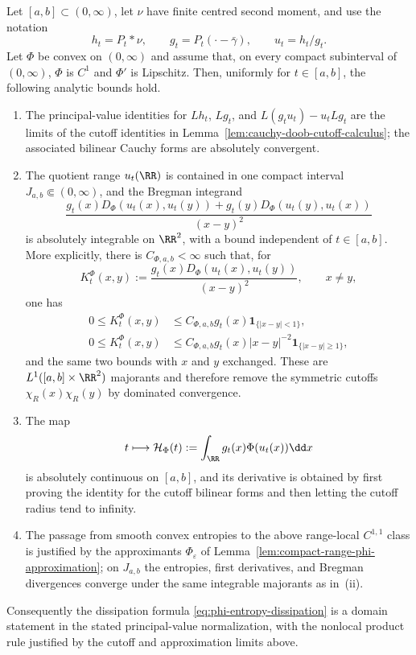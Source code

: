 \begin{lemma}%
\label{lem:doob-bregman-domain-bounds}
Let $[a,b]\subset(0,\infty)$, let $\nu$ have finite centred second moment, and
use the notation
\[
h_t=P_t*\nu,
\qquad
g_t=P_t(\cdot-\bar{\gamma}),
\qquad
u_t=h_t/g_t .
\]
Let $\Phi$ be convex on $(0,\infty)$ and assume that, on every compact
subinterval of $(0,\infty)$, $\Phi$ is $C^1$ and $\Phi'$ is Lipschitz.  Then,
uniformly for $t\in[a,b]$, the following analytic bounds hold.
\begin{enumerate}[label=\textup{(\roman*)},leftmargin=*]
\item The principal-value identities for $Lh_t$, $Lg_t$, and
$L(g_tu_t)-u_tLg_t$ are the limits of the cutoff identities in
Lemma~\ref{lem:cauchy-doob-cutoff-calculus}; the associated bilinear Cauchy
forms are absolutely convergent.
\item The quotient range $u_t(\RR)$ is contained in one compact interval
$J_{a,b}\Subset(0,\infty)$, and the Bregman integrand
\[
\frac{g_t(x)D_\Phi(u_t(x),u_t(y))
      +g_t(y)D_\Phi(u_t(y),u_t(x))}{(x-y)^2}
\]
is absolutely integrable on $\RR^2$, with a bound independent of
$t\in[a,b]$.  More explicitly, there is
$C_{\Phi,a,b}<\infty$ such that, for
\[
K_t^\Phi(x,y):=
\frac{g_t(x)D_\Phi(u_t(x),u_t(y))}{(x-y)^2},
\qquad x\ne y,
\]
one has
\begin{align*}
0\le K_t^\Phi(x,y)
&\le C_{\Phi,a,b}g_t(x)\mathbf 1_{\{|x-y|<1\}},\\
0\le K_t^\Phi(x,y)
&\le C_{\Phi,a,b}g_t(x)|x-y|^{-2}
\mathbf 1_{\{|x-y|\ge1\}},
\end{align*}
and the same two bounds with \(x\) and \(y\) exchanged.  These are
\(L^1([a,b]\times\RR^2)\) majorants and therefore remove the symmetric
cutoffs \(\chi_R(x)\chi_R(y)\) by dominated convergence.
\item The map
\[
t\longmapsto \mathcal H_\Phi(t):=
\int_{\RR}g_t(x)\Phi(u_t(x))\dd x
\]
is absolutely continuous on $[a,b]$, and its derivative is obtained by
first proving the identity for the cutoff bilinear forms and then letting the
cutoff radius tend to infinity.
\item The passage from smooth convex entropies to the above range-local
$C^{1,1}$ class is justified by the approximants
$\Phi_\varepsilon$ of Lemma~\ref{lem:compact-range-phi-approximation}; on
$J_{a,b}$ the entropies, first derivatives, and Bregman divergences converge
under the same integrable majorants as in~\textup{(ii)}.
\end{enumerate}
Consequently the dissipation formula
\eqref{eq:phi-entropy-dissipation} is a domain statement in the stated
principal-value normalization, with the nonlocal product rule justified by the
cutoff and approximation limits above.
\end{lemma}

